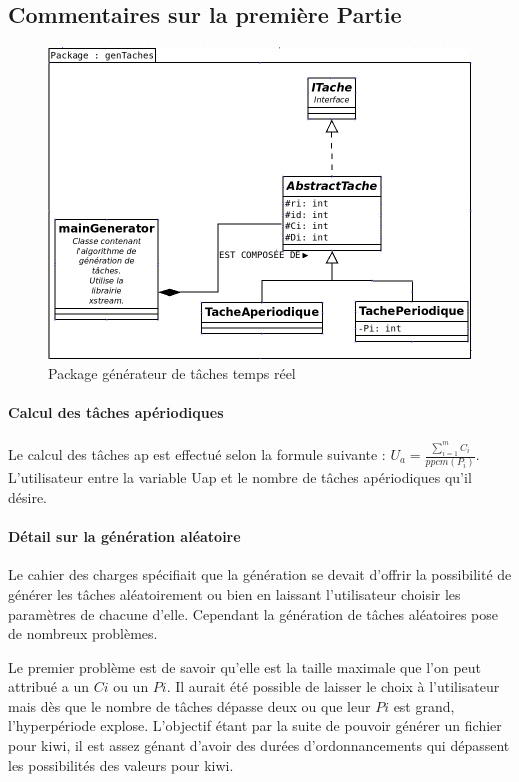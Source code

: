 \subsection{Commentaires sur la première Partie}
   \begin{figure}[htbp]
  \centering
  \includegraphics[scale=0.60]{img/packgen}
  \caption{Package générateur de tâches temps réel}
  \label{fig:gen}
\end{figure}

\paragraph{Calcul des tâches apériodiques} 
Le calcul des tâches ap est effectué selon la formule suivante : $ U_a =  \frac{\sum_{i=1}^m C_i}{ppcm(P_i)}$. L'utilisateur entre la variable Uap  et le nombre de tâches apériodiques qu'il désire. 
\paragraph{Détail sur la génération aléatoire}\label{PremPart}
Le cahier des charges spécifiait que la génération se devait d'offrir la possibilité de générer les tâches aléatoirement ou bien en laissant l'utilisateur choisir les paramètres de chacune d'elle. Cependant la génération de tâches aléatoires pose de nombreux problèmes.

Le premier problème est de savoir qu'elle est la taille maximale que l'on peut attribué a un $Ci$ ou un $Pi$. Il aurait été possible de laisser le choix à l'utilisateur mais dès que le nombre de tâches dépasse deux ou que leur $Pi$ est grand, l'hyperpériode explose. L'objectif étant par la suite de pouvoir générer un fichier pour kiwi, il est assez génant d'avoir des durées d'ordonnancements qui dépassent les possibilités des valeurs pour kiwi.

